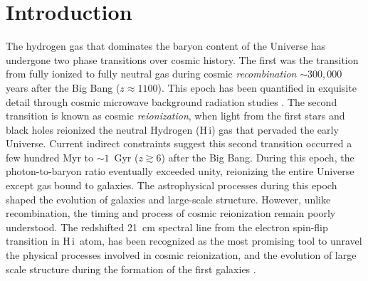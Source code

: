 \documentclass[
reprint,
superscriptaddress,
amsmath,
amssymb,
aps,
prd
]{revtex4-1}
\newcommand{\HI}{H\,{\sc i}}
\begin{document}
\pacs{}%


\maketitle


\section{Introduction}\label{sec:intro}

The hydrogen gas that dominates the baryon content of the Universe has undergone two phase transitions over cosmic history. The first was the transition from fully ionized to fully neutral gas during cosmic \emph{recombination\/} $\sim 300,000$ years after the Big Bang ($z\approx 1100$). This epoch has been quantified in exquisite detail through cosmic microwave background radiation studies \cite{planck15i}. The second transition is known as cosmic \emph{reionization}, when light from the first stars and black holes reionized the neutral Hydrogen (\HI) gas that pervaded the early Universe. Current indirect constraints suggest this second transition occurred a few hundred Myr to $\sim 1$~Gyr ($z\gtrsim 6$) \cite{gre17a} after the Big Bang. During this epoch, the photon-to-baryon ratio eventually exceeded unity, reionizing the entire Universe except gas bound to galaxies. The astrophysical processes during this epoch shaped the evolution of galaxies and large-scale structure. However, unlike recombination, the timing and process of cosmic reionization remain poorly understood. The redshifted 21~cm spectral line from the electron spin-flip transition in \HI\ atom, has been recognized as the most promising tool to unravel the physical processes involved in cosmic reionization, and the evolution of large scale structure during the formation of the first galaxies \cite{sun72,sco90,mad97,toz00,ili02,fan02,fan06,bar07,mor10}.
\end{document}
